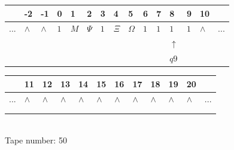 \documentclass[11pt]{article}
\begin{document}
\begin{table}[H]
\centering
\begin{tabular}{lllllllllllllll}
 & -2 & -1 & 0 & 1 & 2 & 3 & 4 & 5 & 6 & 7 & 8 & 9 & 10 & \\
\hline
$...$ & \multicolumn{1}{|l|}{$\wedge$} & \multicolumn{1}{|l|}{$\wedge$} & \multicolumn{1}{|l|}{$1$} & \multicolumn{1}{|l|}{$M$} & \multicolumn{1}{|l|}{$\Psi$} & \multicolumn{1}{|l|}{$1$} & \multicolumn{1}{|l|}{$\Xi$} & \multicolumn{1}{|l|}{$\Omega$} & \multicolumn{1}{|l|}{$1$} & \multicolumn{1}{|l|}{$1$} & \multicolumn{1}{|l|}{$1$} & \multicolumn{1}{|l|}{$1$} & \multicolumn{1}{|l|}{$\wedge$} & $...$\\
\hline
&  &  &  &  &  &  &  &  &  &  & $\uparrow$ &  &  &  \\
&  &  &  &  &  &  &  &  &  &  & $ q9 $ &  &  &  \\
\end{tabular}
\begin{tabular}{llllllllllll}
 & 11 & 12 & 13 & 14 & 15 & 16 & 17 & 18 & 19 & 20 & \\
\hline
$...$ & \multicolumn{1}{|l|}{$\wedge$} & \multicolumn{1}{|l|}{$\wedge$} & \multicolumn{1}{|l|}{$\wedge$} & \multicolumn{1}{|l|}{$\wedge$} & \multicolumn{1}{|l|}{$\wedge$} & \multicolumn{1}{|l|}{$\wedge$} & \multicolumn{1}{|l|}{$\wedge$} & \multicolumn{1}{|l|}{$\wedge$} & \multicolumn{1}{|l|}{$\wedge$} & \multicolumn{1}{|l|}{$\wedge$} & $...$\\
\hline
&  &  &  &  &  &  &  &  &  &  &  \\
&  &  &  &  &  &  &  &  &  &  &  \\
\end{tabular}
\\
Tape number: 50
\noindent\makebox[\linewidth]{\hdashrule{\textwidth}{1pt}{1pt}}\end{table}
\end{document}
